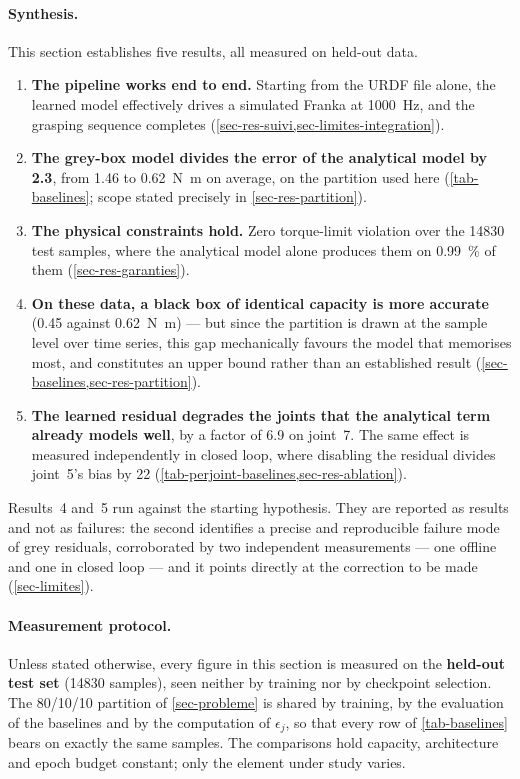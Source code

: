 \documentclass[a4paper, oneside]{article}
\begin{document}
\paragraph{Synthesis.} This section establishes five results, all measured on
held-out data.

\begin{enumerate}
    \item \textbf{The pipeline works end to end.} Starting from the URDF file
    alone, the learned model effectively drives a simulated Franka at
    \SI{1000}{\hertz}, and the grasping sequence completes
    (\cref{sec-res-suivi,sec-limites-integration}).
    \item \textbf{The grey-box model divides the error of the analytical model
    by \num{2.3}}, from \SI{1.46}{} to \SI{0.62}{\newton\meter} on average, on
    the partition used here (\cref{tab-baselines}; scope stated precisely in
    \cref{sec-res-partition}).
    \item \textbf{The physical constraints hold.} Zero torque-limit violation
    over the \SI{14830}{} test samples, where the analytical model alone
    produces them on \SI{0.99}{\percent} of them (\cref{sec-res-garanties}).
    \item \textbf{On these data, a black box of identical capacity is more
    accurate} (\SI{0.45}{} against \SI{0.62}{\newton\meter}) --- but since the
    partition is drawn at the sample level over time series, this gap
    mechanically favours the model that memorises most, and constitutes an
    upper bound rather than an established result
    (\cref{sec-baselines,sec-res-partition}).
    \item \textbf{The learned residual degrades the joints that the analytical
    term already models well}, by a factor of \num{6.9} on joint~7. The same
    effect is measured independently in closed loop, where disabling the
    residual divides joint~5's bias by \num{22}
    (\cref{tab-perjoint-baselines,sec-res-ablation}).
\end{enumerate}

Results~4 and~5 run against the starting hypothesis. They are reported as
results and not as failures: the second identifies a precise and reproducible
failure mode of grey residuals, corroborated by two independent measurements
--- one offline and one in closed loop --- and it points directly at the
correction to be made (\cref{sec-limites}).

\paragraph{Measurement protocol.} Unless stated otherwise, every figure in this
section is measured on the \textbf{held-out test set} (\SI{14830}{} samples),
seen neither by training nor by checkpoint selection. The 80/10/10 partition of
\cref{sec-probleme} is shared by training, by the evaluation of the baselines
and by the computation of $\epsilon_j$, so that every row of
\cref{tab-baselines} bears on exactly the same samples. The comparisons hold
capacity, architecture and epoch budget constant; only the element under study
varies.
\end{document}
